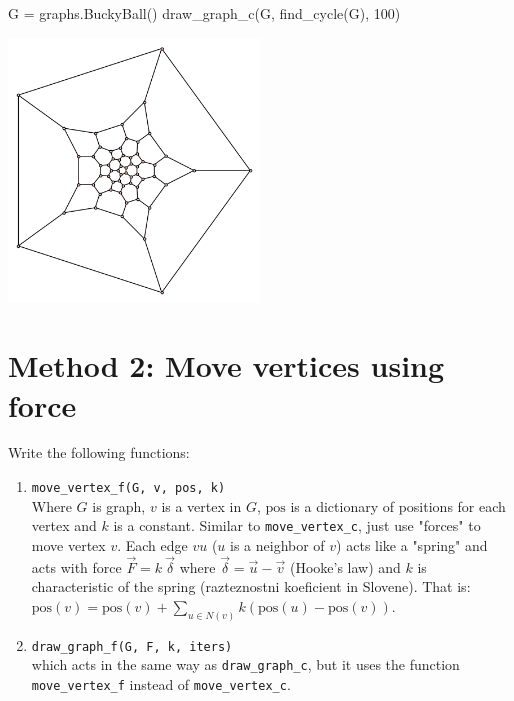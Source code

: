 \begin{sageCell}
    G = graphs.BuckyBall()
    draw_graph_c(G, find_cycle(G), 100)
\end{sageCell}
\begin{outImage}
    \includegraphics[width=0.5\textwidth]{Images/Drawing/bucky_ball_mass_100.png}
\end{outImage}

\section{Method 2: Move vertices using force}

Write the following functions:
\begin{enumerate}
\item \verb|move_vertex_f(G, v, pos, k)|\\
    Where $G$ is graph, $v$ is a vertex in $G$, $\mathrm{pos}$ is a dictionary of positions for each vertex and $k$ is a constant.
    Similar to \verb|move_vertex_c|, just use "forces" to move vertex $v$. Each edge $vu$ ($u$ is a neighbor of $v$) acts like a "spring" and acts with force $\vec{F} = k\: \vec{\delta}$ where $\vec{\delta} = \vec{u} - \vec{v}$ (Hooke's law) and $k$ is characteristic of the spring (razteznostni koeficient in Slovene). That is: $\mathrm{pos}(v) = \mathrm{pos}(v) + \sum_{u \in N(v)} k (\mathrm{pos}(u) - \mathrm{pos}(v))$.
\item \verb|draw_graph_f(G, F, k, iters)|\\
    which acts in the same way as \verb|draw_graph_c|, but it uses the function \verb|move_vertex_f| instead of \verb|move_vertex_c|.
\end{enumerate}

